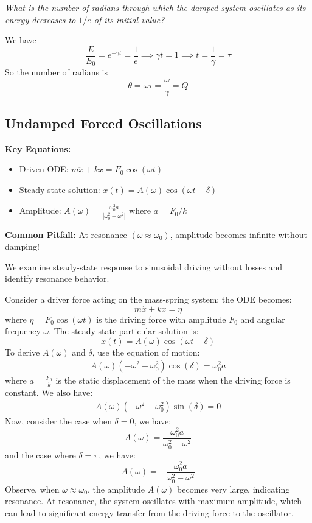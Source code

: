 \documentclass[11pt]{report}
\begin{document}
\begin{example}
    \textit{What is the number of radians through which the damped system oscillates as its energy decreases to $1/e$ of its initial value?}

    We have
    $$
    \frac{E}{E_0} = e^{-\gamma t} = \frac{1}{e} \implies \gamma t = 1 \implies t = \frac{1}{\gamma} = \tau
    $$
    So the number of radians is
    $$
    \theta = \omega \tau = \frac{\omega}{\gamma} = Q
    $$
    
\end{example}

\subsection{Undamped Forced Oscillations}

\begin{keybox}
\textbf{Key Equations:}
\begin{itemize}
    \item Driven ODE: $m\ddot{x} + kx = F_0\cos(\omega t)$
    \item Steady-state solution: $x(t) = A(\omega)\cos(\omega t - \delta)$
    \item Amplitude: $A(\omega) = \frac{\omega_0^2 a}{|\omega_0^2 - \omega^2|}$ where $a = F_0/k$
\end{itemize}
\textbf{Common Pitfall:} At resonance $(\omega \approx \omega_0)$, amplitude becomes infinite without damping!
\end{keybox}

We examine steady-state response to sinusoidal driving without losses and identify resonance behavior.
\begin{definition}
    Consider a driver force acting on the mass-spring system; the ODE becomes:
    $$
        m\ddot{x} + kx = \eta
    $$
    where \( \eta = F_0 \cos(\omega t) \) is the driving force with amplitude \( F_0 \) and angular frequency \( \omega \). The steady-state particular solution is:
    $$
        x(t) = A(\omega)\cos(\omega t - \delta) 
    $$
    To derive $A(\omega)$ and $\delta$, use the equation of motion:
    \begin{align*}
        A(\omega)(-\omega^2 + \omega_0^2) \cos(\delta) = \omega_0^2 a
    \end{align*}
    where \( a = \frac{F_0}{k} \) is the static displacement of the mass when the driving force is constant. We also have:
    \begin{align*}
        A(\omega)(-\omega^2 + \omega_0^2) \sin(\delta) = 0
    \end{align*}
    Now, consider the case when $\delta = 0$, we have:
    $$
        A(\omega) = \frac{\omega_0^2 a}{\omega_0^2 - \omega^2}
    $$
    and the case where \( \delta = \pi \), we have:
    $$
        A(\omega) = -\frac{\omega_0^2 a}{\omega_0^2 - \omega^2}
    $$
    Observe, when $\omega \approx \omega_0$, the amplitude \( A(\omega) \) becomes very large, indicating resonance. At resonance, the system oscillates with maximum amplitude, which can lead to significant energy transfer from the driving force to the oscillator.
\end{definition}
\end{document}
